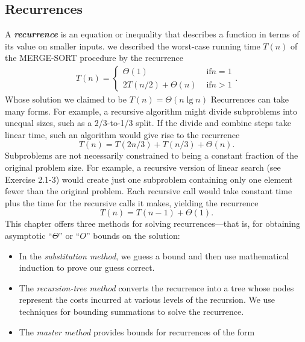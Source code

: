 \documentclass{report}
\begin{document}
        \subsection{Recurrences}
        \bigbreak \noindent 
        A \textbf{\textit{recurrence}} is an equation or inequality that describes a function in terms of its value on smaller inputs. we described the worst-case running time $T(n)$ of the MERGE-SORT procedure by the recurrence
        \begin{align*}
            T(n) = \begin{cases}
                \Theta(1) & \text{ if} n = 1 \\
                2T(n/2) + \Theta(n) & \text{ if} n > 1
            \end{cases}
        .\end{align*}
        \bigbreak \noindent 
        Whose solution we claimed to be $T(n)  = \Theta(n\lg n)$
        \bigbreak \noindent 
        Recurrences can take many forms. For example, a recursive algorithm might divide subproblems into unequal sizes, such as a 2/3-to-1/3 split. If the divide and combine steps take linear time, such an algorithm would give rise to the recurrence
        \[
            T(n) = T(2n/3) + T(n/3) + \Theta(n).
        \]
        Subproblems are not necessarily constrained to being a constant fraction of the original problem size. For example, a recursive version of linear search (see Exercise 2.1-3) would create just one subproblem containing only one element fewer than the original problem. Each recursive call would take constant time plus the time for the recursive calls it makes, yielding the recurrence
        \[
            T(n) = T(n-1) + \Theta(1).
        \]
        This chapter offers three methods for solving recurrences—that is, for obtaining asymptotic “\(\Theta\)” or “\(O\)” bounds on the solution:
        \begin{itemize}
            \item In the \textit{substitution method}, we guess a bound and then use mathematical induction to prove our guess correct.
            \item The \textit{recursion-tree method} converts the recurrence into a tree whose nodes represent the costs incurred at various levels of the recursion. We use techniques for bounding summations to solve the recurrence.
            \item The \textit{master method} provides bounds for recurrences of the form
        \end{itemize}
\end{document}
